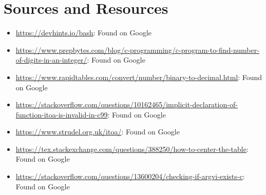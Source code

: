 \documentclass{article}
\begin{document}
\newpage

\section{Sources and Resources}

\begin{flushleft}
\begin{itemize}
    \item{\url{https://devhints.io/bash}: Found on Google}
    \item{\url{https://www.prepbytes.com/blog/c-programming/c-program-to-find-number-of-digits-in-an-integer/}: Found on Google}
    \item{\url{https://www.rapidtables.com/convert/number/binary-to-decimal.html}: Found on Google}
    \item{\url{https://stackoverflow.com/questions/10162465/implicit-declaration-of-function-itoa-is-invalid-in-c99}: Found on Google}
    \item{\url{https://www.strudel.org.uk/itoa/}: Found on Google}
    \item{\url{https://tex.stackexchange.com/questions/388250/how-to-center-the-table}: Found on Google}
    \item{\url{https://stackoverflow.com/questions/13600204/checking-if-argvi-exists-c}: Found on Google}
\end{itemize}
\end{flushleft}
\end{document}
